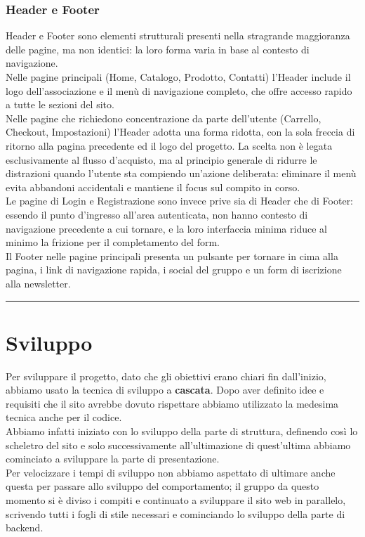 \documentclass[11pt,a4paper]{article}
\newcommand{\sectionrule}{\vspace{0.5em}\noindent\rule{\linewidth}{0.4pt}\vspace{0.5em}}
\begin{document}
\subsubsection{Header e Footer}
Header e Footer sono elementi strutturali presenti nella stragrande maggioranza delle pagine, ma non identici: la loro forma varia in base al contesto di navigazione.\\
Nelle pagine principali (Home, Catalogo, Prodotto, Contatti) l'Header include il logo dell'associazione e il men\`u di navigazione completo, che offre accesso rapido a tutte le sezioni del sito.\\
Nelle pagine che richiedono concentrazione da parte dell'utente (Carrello, Checkout, Impostazioni) l'Header adotta una forma ridotta, con la sola freccia di ritorno alla pagina precedente ed il logo del progetto. La scelta non \`e legata esclusivamente al flusso d'acquisto, ma al principio generale di ridurre le distrazioni quando l'utente sta compiendo un'azione deliberata: eliminare il men\`u evita abbandoni accidentali e mantiene il focus sul compito in corso.\\
Le pagine di Login e Registrazione sono invece prive sia di Header che di Footer: essendo il punto d'ingresso all'area autenticata, non hanno contesto di navigazione precedente a cui tornare, e la loro interfaccia minima riduce al minimo la frizione per il completamento del form.\\
Il Footer nelle pagine principali presenta un pulsante per tornare in cima alla pagina, i link di navigazione rapida, i social del gruppo e un form di iscrizione alla newsletter.

\sectionrule

\section{Sviluppo}

Per sviluppare il progetto, dato che gli obiettivi erano chiari fin dall'inizio, abbiamo usato la tecnica di sviluppo a \textbf{cascata}. Dopo aver definito idee e requisiti che il sito avrebbe dovuto rispettare abbiamo utilizzato la medesima tecnica anche per il codice.\\
Abbiamo infatti iniziato con lo sviluppo della parte di struttura, definendo cos\`i lo scheletro del sito e solo successivamente all'ultimazione di quest'ultima abbiamo cominciato a sviluppare la parte di presentazione.\\
Per velocizzare i tempi di sviluppo non abbiamo aspettato di ultimare anche questa per passare allo sviluppo del comportamento; il gruppo da questo momento si \`e diviso i compiti e continuato a sviluppare il sito web in parallelo, scrivendo tutti i fogli di stile necessari e cominciando lo sviluppo della parte di backend.
\end{document}
